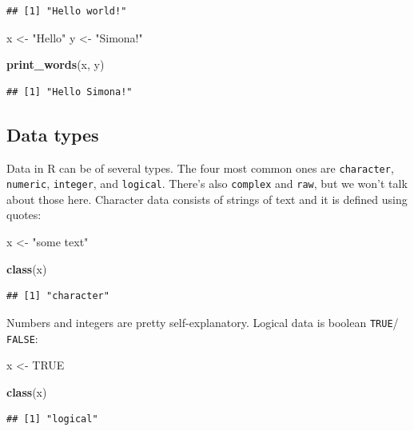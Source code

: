 \documentclass[
]{book}
\newenvironment{Shaded}{\begin{snugshade}}{\end{snugshade}}
\newcommand{\ConstantTok}[1]{\textcolor[rgb]{0.56,0.35,0.01}{#1}}
\newcommand{\FunctionTok}[1]{\textcolor[rgb]{0.13,0.29,0.53}{\textbf{#1}}}
\newcommand{\NormalTok}[1]{#1}
\newcommand{\OtherTok}[1]{\textcolor[rgb]{0.56,0.35,0.01}{#1}}
\newcommand{\StringTok}[1]{\textcolor[rgb]{0.31,0.60,0.02}{#1}}
\begin{document}
\begin{verbatim}
## [1] "Hello world!"
\end{verbatim}

\begin{Shaded}
\begin{Highlighting}[]
\NormalTok{x }\OtherTok{\textless{}{-}} \StringTok{"Hello"}
\NormalTok{y }\OtherTok{\textless{}{-}} \StringTok{"Simona!"}

\FunctionTok{print\_words}\NormalTok{(x, y)}
\end{Highlighting}
\end{Shaded}

\begin{verbatim}
## [1] "Hello Simona!"
\end{verbatim}

\hypertarget{data-types-1}{%
\subsection{Data types}\label{data-types-1}}

Data in R can be of several types. The four most common ones are \texttt{character},
\texttt{numeric}, \texttt{integer}, and \texttt{logical}. There's also \texttt{complex} and \texttt{raw}, but we
won't talk about those here. Character data consists of strings of text and it
is defined using quotes:

\begin{Shaded}
\begin{Highlighting}[]
\NormalTok{x }\OtherTok{\textless{}{-}} \StringTok{"some text"}

\FunctionTok{class}\NormalTok{(x)}
\end{Highlighting}
\end{Shaded}

\begin{verbatim}
## [1] "character"
\end{verbatim}

Numbers and integers are pretty self-explanatory. Logical data is boolean \texttt{TRUE}/
\texttt{FALSE}:

\begin{Shaded}
\begin{Highlighting}[]
\NormalTok{x }\OtherTok{\textless{}{-}} \ConstantTok{TRUE}

\FunctionTok{class}\NormalTok{(x)}
\end{Highlighting}
\end{Shaded}

\begin{verbatim}
## [1] "logical"
\end{verbatim}
\end{document}
